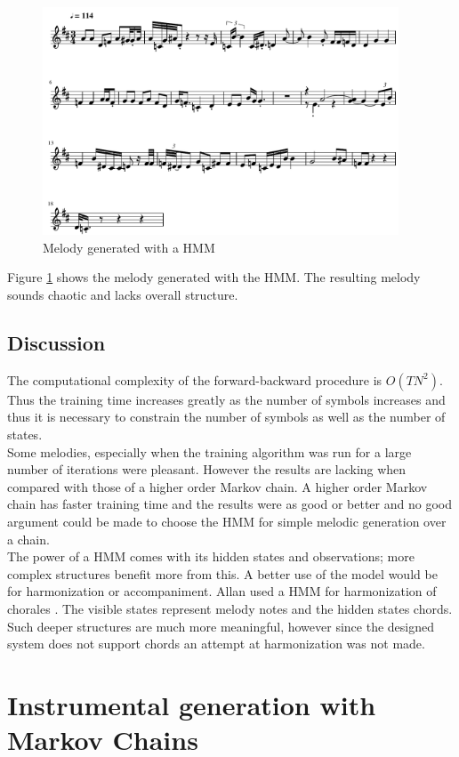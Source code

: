 \begin{figure}[h!]
\centerline{\includegraphics[width=400px]{../images/hmm_melody_generated.pdf}}
\caption{Melody generated with a \ac{HMM}}
\label{ims:hmmmelody}
\end{figure}

Figure \ref{ims:hmmmelody} shows the melody generated with the \ac{HMM}. The resulting melody sounds chaotic and lacks overall structure.

\section{Discussion}
The computational complexity of the forward-backward procedure is $O(T N^2)$. Thus the training time increases greatly as the number of symbols increases and thus it is necessary to constrain the number of symbols as well as the number of states.
\\
Some melodies, especially when the training algorithm was run for a large number of iterations were pleasant. However the results are lacking when compared with those of a higher order Markov chain. A higher order Markov chain has faster training time and the results were as good or better and no good argument could be made to choose the \ac{HMM} for simple melodic generation over a chain.
\\
The power of a \ac{HMM} comes with its hidden states and observations; more complex structures benefit more from this. A better use of the model would be for harmonization or accompaniment. Allan used a \ac{HMM} for harmonization of chorales \cite{Allan2004}. The visible states represent melody notes and the hidden states chords. Such deeper structures are much more meaningful, however since the designed system does not support chords an attempt at harmonization was not made.

\chapter{Instrumental generation with Markov Chains}
